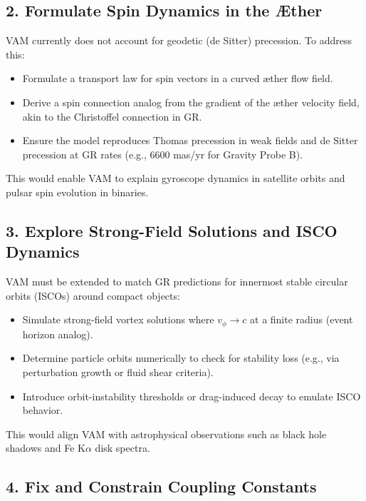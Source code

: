 \subsection*{2. Formulate Spin Dynamics in the Æther}

VAM currently does not account for geodetic (de Sitter) precession. To address this:

\begin{itemize}
    \item Formulate a transport law for spin vectors in a curved æther flow field.
    \item Derive a spin connection analog from the gradient of the æther velocity field, akin to the Christoffel connection in GR.
    \item Ensure the model reproduces Thomas precession in weak fields and de Sitter precession at GR rates (e.g., $6600$ mas/yr for Gravity Probe B).
\end{itemize}

This would enable VAM to explain gyroscope dynamics in satellite orbits and pulsar spin evolution in binaries.

\subsection*{3. Explore Strong-Field Solutions and ISCO Dynamics}

VAM must be extended to match GR predictions for innermost stable circular orbits (ISCOs) around compact objects:

\begin{itemize}
    \item Simulate strong-field vortex solutions where $v_\phi \rightarrow c$ at a finite radius (event horizon analog).
    \item Determine particle orbits numerically to check for stability loss (e.g., via perturbation growth or fluid shear criteria).
    \item Introduce orbit-instability thresholds or drag-induced decay to emulate ISCO behavior.
\end{itemize}

This would align VAM with astrophysical observations such as black hole shadows and Fe K$\alpha$ disk spectra.

\subsection*{4. Fix and Constrain Coupling Constants}


